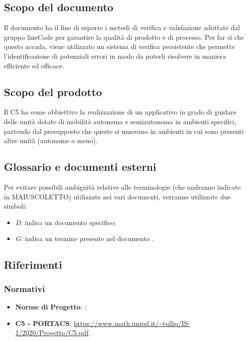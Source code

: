 \subsection{Scopo del documento}
Il documento ha il fine di esporre i metodi di verifica e validazione adottate dal gruppo lineCode per garantire la qualità di prodotto e di processo. Per far sì che questo accada, viene utilizzato un sistema di verifica persistente che permette l'identificazione di potenziali errori in modo da poterli risolvere in maniera efficiente ed efficace.

\subsection{Scopo del prodotto}
Il  C5 ha come obbiettivo la realizzazione di un applicativo  in grado di guidare delle unità dotate di mobilità autonoma e semiautonoma in ambienti specifici, partendo dal presupposto che queste si muovano in ambienti in cui sono presenti altre unità (autonome o meno).

\subsection{Glossario e documenti esterni}
Per evitare possibili ambiguità relative alle terminologie (che andranno indicate in MAIUSCOLETTO) utilizzate nei vari documenti, verranno utilizzate due simboli:
\begin{itemize}
	\item \textit{D}: indica un documento specifico;
	\item \textit{G}: indica un termine presente nel documento .
\end{itemize}

\subsection{Riferimenti}

\subsubsection{Normativi}
\begin{itemize}
	\item \textbf{Norme di Progetto}: ;
	\item \textbf{ C5 - PORTACS}:					\url{https://www.math.unipd.it/~tullio/IS-1/2020/Progetto/C5.pdf}.
\end{itemize}


